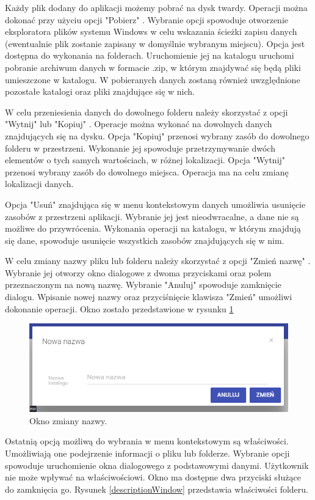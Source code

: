 Każdy plik dodany do aplikacji możemy pobrać na dysk twardy. Operacji można dokonać przy użyciu opcji "Pobierz" . Wybranie opcji spowoduje otworzenie eksploratora plików systemu Windows w celu wskazania ścieżki zapisu danych (ewentualnie plik zostanie zapisany w domyślnie wybranym miejscu). Opcja jest dostępna do wykonania na folderach. Uruchomienie jej na katalogu uruchomi pobranie archiwum danych w formacie .zip, w którym znajdywać się będą pliki umieszczone w katalogu. W pobieranych danych zostaną również uwzględnione pozostałe katalogi oraz pliki znajdujące się w nich.

W celu przeniesienia danych do dowolnego folderu należy skorzystać z opcji "Wytnij" lub "Kopiuj" . Operacje można wykonać na dowolnych danych znajdujących się na dysku. Opcja "Kopiuj" przenosi wybrany zasób do dowolnego folderu w przestrzeni. Wykonanie jej spowoduje przetrzymywanie dwóch elementów o tych samych wartościach, w różnej lokalizacji. Opcja "Wytnij" przenosi wybrany zasób do dowolnego miejsca. Operacja ma na celu zmianę lokalizacji danych.

Opcja "Usuń" znajdująca się w menu kontekstowym danych umożliwia usunięcie zasobów z przestrzeni aplikacji. Wybranie jej jest nieodwracalne, a dane nie są możliwe do przywrócenia. Wykonania operacji na katalogu, w którym znajdują się dane, spowoduje usunięcie wszystkich zasobów znajdujących się w nim.

W celu zmiany nazwy pliku lub folderu należy skorzystać z opcji "Zmień nazwę" . Wybranie jej otworzy okno dialogowe z dwoma przyciskami oraz polem przeznaczonym na nową nazwę. Wybranie "Anuluj" spowoduje zamknięcie dialogu. Wpisanie nowej nazwy oraz przyciśnięcie klawisza "Zmień" umożliwi dokonanie operacji. Okno zostało przedstawione w rysunku \ref{ChangeName}

\begin{figure}[!h]
	\centering
	\includegraphics[width=0.7\linewidth]{"obrazy/6.3 ZmianaNazwy"}
	\caption{Okno zmiany nazwy.}
	\label{ChangeName}
\end{figure}

Ostatnią opcją możliwą do wybrania w menu kontekstowym są właściwości. Umożliwiają one podejrzenie informacji o pliku lub folderze. Wybranie opcji spowoduje uruchomienie okna dialogowego z podstawowymi danymi. Użytkownik nie może wpływać na właściwościowi. Okno ma dostępne dwa przyciski służące do zamknięcia go. Rysunek \ref{descriptionWindow} przedstawia właściwości folderu.

